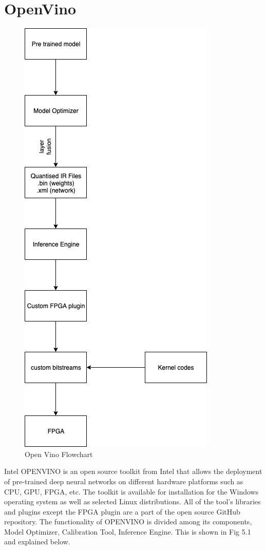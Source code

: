\documentclass[titlepage]{report}
\begin{document}
\section{OpenVino}
\begin{figure}[!]
    \centering
    \includegraphics[scale=0.65]{open_vino_flowchart.jpg}
    \caption{Open Vino Flowchart}
\end{figure}

Intel OPENVINO is an open source toolkit from Intel that allows the deployment of pre-trained deep neural networks on different hardware platforms such as CPU, GPU, FPGA, etc. The toolkit is available for installation for the Windows operating system as well as selected Linux distributions. All of the tool's libraries and plugins except the FPGA plugin are a part of the open source GitHub repository.
The functionality of OPENVINO is divided among its components, Model Optimizer, Calibration Tool,  Inference Engine. This is shown in Fig 5.1 and explained below. 
\end{document}
